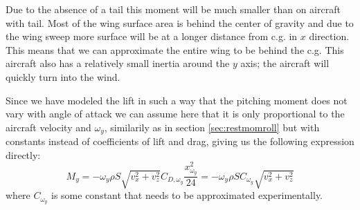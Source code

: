 Due to the absence of a tail this moment will be much smaller than on aircraft with tail.
Most of the wing surface area is behind the center of gravity and due to the wing sweep more surface will be at a longer distance from c.g. in $x$ direction.
This means that we can approximate the entire wing to be behind the c.g.
This aircraft also has a relatively small inertia around the $y$ axis; the aircraft will quickly turn into the wind.

Since we have modeled the lift in such a way that the pitching moment does not vary with angle of attack we can assume here that it is only proportional to the aircraft velocity and $\omega_y$, similarily as in section \ref{sec:restmomroll} but with constants instead of coefficients of lift and drag, giving us the following expression directly:
\begin{equation}
    M_y = -\omega_y \rho S \sqrt{v_x^2 + v_z^2} C_{D,\omega_y} \frac{x_{\omega_y}^2}{24}
    =
    -\omega_y \rho S C_{\omega_y} \sqrt{v_x^2 + v_z^2}
\end{equation}
where $C_{\omega_y}$ is some constant that needs to be approximated experimentally.
